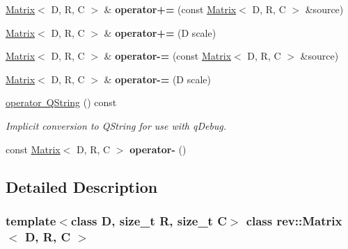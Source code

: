 \begin{DoxyCompactItemize}
\item 
\mbox{\label{classrev_1_1_matrix_aad6fbad2119fa2db6e98e4ac8e40c941}} 
\mbox{\hyperlink{classrev_1_1_matrix}{Matrix}}$<$ D, R, C $>$ \& {\bfseries operator+=} (const \mbox{\hyperlink{classrev_1_1_matrix}{Matrix}}$<$ D, R, C $>$ \&source)
\item 
\mbox{\label{classrev_1_1_matrix_af55209c362c30b47ae77e217f614b8bb}} 
\mbox{\hyperlink{classrev_1_1_matrix}{Matrix}}$<$ D, R, C $>$ \& {\bfseries operator+=} (D scale)
\item 
\mbox{\label{classrev_1_1_matrix_a44e3eeb00e5437d702ea130c2bfacc2b}} 
\mbox{\hyperlink{classrev_1_1_matrix}{Matrix}}$<$ D, R, C $>$ \& {\bfseries operator-\/=} (const \mbox{\hyperlink{classrev_1_1_matrix}{Matrix}}$<$ D, R, C $>$ \&source)
\item 
\mbox{\label{classrev_1_1_matrix_ab6ce88aa0d4b82a7718d8480bead76e7}} 
\mbox{\hyperlink{classrev_1_1_matrix}{Matrix}}$<$ D, R, C $>$ \& {\bfseries operator-\/=} (D scale)
\item 
\mbox{\label{classrev_1_1_matrix_a2199777baea7cb111b0483cc13e12393}} 
\mbox{\hyperlink{classrev_1_1_matrix_a2199777baea7cb111b0483cc13e12393}{operator Q\+String}} () const
\begin{DoxyCompactList}\small\item\em Implicit conversion to Q\+String for use with q\+Debug. \end{DoxyCompactList}\item 
\mbox{\label{classrev_1_1_matrix_ae09e5d1019a882aaf23423bc88dbb307}} 
const \mbox{\hyperlink{classrev_1_1_matrix}{Matrix}}$<$ D, R, C $>$ {\bfseries operator-\/} ()
\end{DoxyCompactItemize}


\subsection{Detailed Description}
\subsubsection*{template$<$class D, size\+\_\+t R, size\+\_\+t C$>$\newline
class rev\+::\+Matrix$<$ D, R, C $>$}

